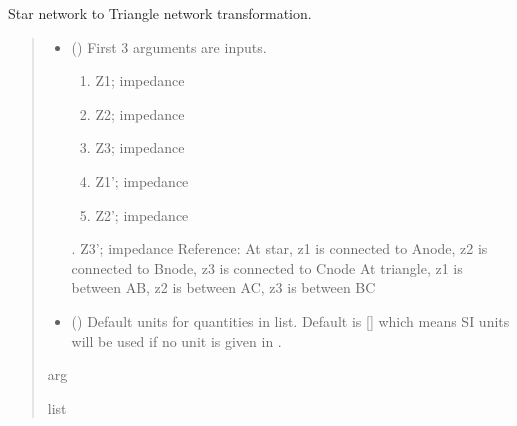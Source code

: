 \documentclass[letterpaper,10pt,english]{sphinxmanual}
\begin{document}

\begin{fulllineitems}
\label{\detokenize{components:components.Star2TriangleTransformation}}
\pysigstartsignatures
{}
\pysigstopsignatures
\sphinxAtStartPar
Star network to Triangle network transformation.
\begin{quote}\begin{description}
\begin{itemize}
\item {}
\sphinxAtStartPar
{} () \textendash{}
\sphinxAtStartPar
First 3 arguments are inputs.
\begin{enumerate}
%
\item {}
\sphinxAtStartPar
Z1; impedance

\item {}
\sphinxAtStartPar
Z2; impedance

\item {}
\sphinxAtStartPar
Z3; impedance

\item {}
\sphinxAtStartPar
Z1’; impedance

\item {}
\sphinxAtStartPar
Z2’; impedance

\end{enumerate}

. Z3’; impedance
Reference:
At star, z1 is connected to A\sphinxhyphen{}node, z2 is connected to B\sphinxhyphen{}node, z3 is connected to C\sphinxhyphen{}node
At triangle, z1 is between A\sphinxhyphen{}B, z2 is between A\sphinxhyphen{}C, z3 is between B\sphinxhyphen{}C


\item {}
\sphinxAtStartPar
{} (\sphinxstyleliteralemphasis{\sphinxupquote{, }}) \textendash{} Default units for quantities in  list. Default is {[}{]} which means SI units will be used if no unit is given in .

\end{itemize}

\sphinxAtStartPar
arg

\sphinxAtStartPar
list

\end{description}\end{quote}

\end{fulllineitems}
\end{document}
